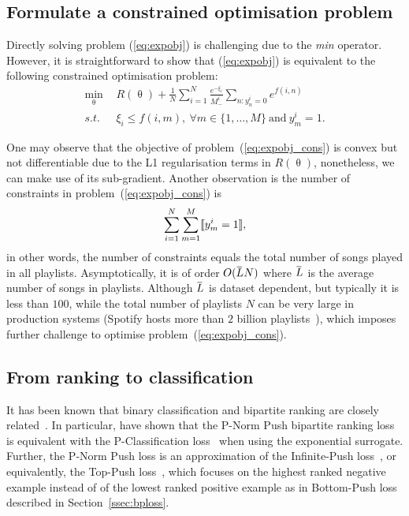 \subsection{Formulate a constrained optimisation problem}

Directly solving problem (\ref{eq:expobj}) is challenging due to the \emph{min} operator.
However, it is straightforward to show that (\ref{eq:expobj}) is equivalent to the following constrained optimisation problem:
\begin{equation}
\label{eq:expobj_cons}
\begin{aligned}
\min_{\uptheta} \ \, & R(\uptheta) + \frac{1}{N} \sum_{i=1}^N \frac{e^{-\xi_i}}{M_-^i} \sum_{n: y_n^i = 0} e^{f(i, n)} \\
s.t. \ \, & \xi_i \le f(i, m), \ \forall m \in \{1,\dots,M\} \ \text{and} \ y_m^i = 1.
\end{aligned}
\end{equation}

One may observe that the objective of problem~(\ref{eq:expobj_cons}) is convex but not differentiable due to the L1 regularisation terms in $R(\uptheta)$,
nonetheless, we can make use of its sub-gradient.
Another observation is the number of constraints in problem~(\ref{eq:expobj_cons}) is 
$$
\sum_{i=1}^N \sum_{m=1}^M \llbracket y_m^i = 1 \rrbracket,
$$
in other words, the number of constraints equals the total number of songs played in all playlists.
Asymptotically, it is of order $O(\widebar{L} N)$ where $\widebar{L}$ is the average number of songs in playlists.
Although $\widebar{L}$ is dataset dependent, but typically it is less than $100$, 
while the total number of playlists $N$ can be very large in production systems (\eg Spotify hosts more than $2$ billion playlists~\cite{recsysch2018}),
which imposes further challenge to optimise problem~(\ref{eq:expobj_cons}).



\subsection{From ranking to classification}

It has been known that binary classification and bipartite ranking are
closely related~\cite{ertekin2011equivalence,menon2016bipartite}.
In particular, \citet{ertekin2011equivalence} have shown that the P-Norm Push bipartite ranking loss~\cite{rudin2009p}
is equivalent with the P-Classification loss~\cite{ertekin2011equivalence} when using the exponential surrogate.
Further, the P-Norm Push loss is an approximation of the Infinite-Push loss~\cite{agarwal2011infinite},
or equivalently, the Top-Push loss~\cite{li2014top}, which focuses on the highest ranked negative example instead of
of the lowest ranked positive example as in Bottom-Push loss described in Section~\ref{ssec:bploss}.

